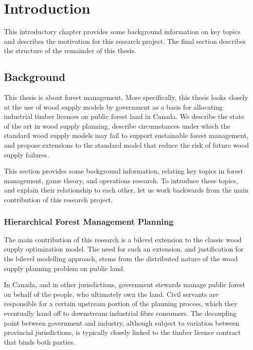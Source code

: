 \setcounter{secnumdepth}{0} 

\chapter*{Introduction}

This introductory chapter provides some background information on key topics and describes the motivation for this research project. The final section describes the structure of the remainder of this thesis.

\section{Background}

This thesis is about forest management. More specifically, this thesis looks closely at the use of wood supply models by government as a basis for allocating industrial timber licences on public forest land in Canada.
We describe the state of the art in wood supply planning, describe circumstances under which the standard wood supply models may fail to support sustainable forest management, and propose extensions to the standard model that reduce the risk of future wood supply failures.

This section provides some background information, relating key topics in forest management, game theory, and operations research. To introduce these topics, and explain their relationship to each other, let us work backwards from the main contribution of this research project. 

\subsection{Hierarchical Forest Management Planning}

The main contribution of this research is a bilevel extension to the classic wood supply optimization model. The need for such an extension, and justification for the bilevel modelling approach, stems from the distributed nature of the wood supply planning problem on public land. 

In Canada, and in other jurisdictions, government stewards manage public forest on behalf of the people, who ultimately own the land. Civil servants are responsible for a certain upstream portion of the planning process, which they eventually hand off to downstream industrial fibre consumers. The decoupling point between government and industry, although subject to variation between provincial jurisdictions, is typically closely linked to the timber licence contract that binds both parties. 


